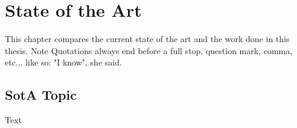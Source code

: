 \documentclass[class=scrbook, crop=false]{standalone}
\begin{document}
\chapter{State of the Art}
\label{Chapter::State_of_the_Art} %
    This chapter compares the current state of the art and the work done in this thesis.
    Note Quotations always end before a full stop, question mark, comma, etc... like so: "I know", she said.

\section{SotA Topic}
\label{Section::SotA_Topic}
    Text
\end{document}
